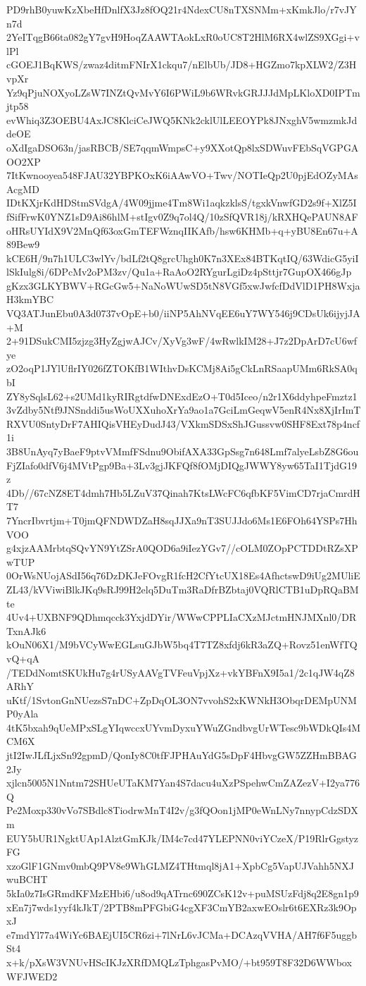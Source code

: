 PD9rhB0yuwKzXbeHfDnlfX3Jz8fOQ21r4NdexCU8nTXSNMm+xKmkJlo/r7vJYn7d
2YeITqgB66ta082gY7gvH9HoqZAAWTAokLxR0oUC8T2HlM6RX4wlZS9XGgi+vlPl
cGOEJ1BqKWS/zwaz4ditmFNIrX1ckqu7/nElbUb/JD8+HGZmo7kpXLW2/Z3HvpXr
Yz9qPjuNOXyoLZsW7INZtQvMvY6I6PWiL9b6WRvkGRJJJdMpLKloXD0IPTmjtp58
evWhiq3Z3OEBU4AxJC8KlciCeJWQ5KNk2cklUlLEEOYPk8JNxghV5wmzmkJddeOE
oXdIgaDSO63n/jasRBCB/SE7qqmWmpsC+y9XXotQp8lxSDWuvFEbSqVGPGAOO2XP
7ItKwnooyea548FJAU32YBPKOxK6iAAwVO+Twv/NOTIeQp2U0pjEdOZyMAsAcgMD
IDtKXjrKdHDStmSVdgA/4W09jjme4Tm8Wi1aqkzklsS/tgxkVnwfGD2s9f+XlZ5I
fSifFrwK0YNZ1sD9Ai86hlM+stIgv0Z9q7ol4Q/10zSfQVR18j/kRXHQePAUN8AF
oHRsUYIdX9V2MnQf63oxGmTEFWznqIIKAfb/hsw6KHMb+q+yBU8En67u+A89Bew9
kCE6H/9n7h1ULC3wlYv/bdLf2tQ8grcUhgh0K7n3XEx84BTKqtIQ/63WdicG5yiI
lSkIulg8i/6DPcMv2oPM3zv/Qu1a+RaAoO2RYgurLgiDz4pSttjr7GupOX466gJp
gKzx3GLKYBWV+RGcGw5+NaNoWUwSD5tN8VGf5xwJwfcfDdVlD1PH8WxjaH3kmYBC
VQ3ATJunEbu0A3d0737vOpE+b0/iiNP5AhNVqEE6uY7WY546j9CDsUk6ijyjJA+M
2+91DSukCMI5zjzg3HyZgjwAJCv/XyVg3wF/4wRwlkIM28+J7z2DpArD7cU6wfye
zO2oqP1JYlUflrIY026fZTOKfB1WIthvDsKCMj8Ai5gCkLnRSaapUMm6RkSA0qbI
ZY8ySqlsL62+s2UMd1kyRIRgtdfwDNExdEzO+T0d5Iceo/n2r1X6ddyhpeFmztz1
3vZdby5Ntf9JNSnddi5usWoUXXuhoXrYa9ao1a7GciLmGeqwV5enR4Nx8XjIrImT
RXVU0SntyDrF7AHIQisVHEyDudJ43/VXkmSDSxShJGussvw0SHF8Ext78p4ncf1i
3B8UnAyq7yBaeF9ptvVMmfFSdnu9ObifAXA33GpSsg7n648Lmf7alyeLsbZ8G6ou
FjZIafo0dfV6j4MVtPgp9Ba+3Lv3gjJKFQf8fOMjDIQgJWWY8yw65TaI1TjdG19z
4Db//67cNZ8ET4dmh7Hb5LZuV37Qinah7KtsLWcFC6qfbKF5VimCD7rjaCmrdHT7
7YncrIbvrtjm+T0jmQFNDWDZaH8sqJJXa9nT3SUJJdo6Ms1E6FOh64YSPs7HhVOO
g4xjzAAMrbtqSQvYN9YtZSrA0QOD6a9iIezYGv7//cOLM0ZOpPCTDDtRZsXPwTUP
0OrWsNUojASdI56q76DzDKJeFOvgR1fcH2CfYtcUX18Es4AfhctswD9iUg2MUliE
ZL43/kVViwiBlkJKq9sRJ99H2elq5DuTm3RaDfrBZbtaj0VQRlCTB1uDpRQaBMte
4Uv4+UXBNF9QDhmqcck3YxjdDYir/WWwCPPLIaCXzMJctmHNJMXnl0/DRTxnAJk6
kOuN06X1/M9bVCyWwEGLsuGJbW5bq4T7TZ8xfdj6kR3aZQ+Rovz51enWfTQvQ+qA
/TEDdNomtSKUkHu7g4rUSyAAVgTVFeuVpjXz+vkYBFnX9I5a1/2c1qJW4qZ8ARhY
uKtf/1SvtonGnNUezsS7nDC+ZpDqOL3ON7vvohS2xKWNkH3ObqrDEMpUNMP0yAla
4tK5bxah9qUeMPxSLgYIqwccxUYvmDyxuYWuZGndbvgUrWTesc9bWDkQIs4MCM6X
jtI2IwJLfLjxSn92gpmD/QonIy8C0tfFJPHAuYdG5sDpF4HbvgGW5ZZHmBBAG2Jy
xjlcn5005N1Nntm72SHUeUTaKM7Yan4S7dacu4uXzPSpehwCmZAZezV+I2ya776Q
Pe2Moxp330vVo7SBdlc8TiodrwMnT4I2v/g3fQOon1jMP0eWnLNy7nnypCdzSDXm
EUY5bUR1NgktUAp1AlztGmKJk/IM4c7cd47YLEPNN0viYCzeX/P19RlrGgstyzFG
xzoGlF1GNmv0mbQ9PV8e9WhGLMZ4THtmql8jA1+XpbCg5VapUJVahh5NXJwuBCHT
5kIa0z7IsGRmdKFMzEHbi6/u8od9qATrnc690ZCsK12v+puMSUzFdj8q2E8gn1p9
xEn7j7wds1yyf4kJkT/2PTB8mPFGbiG4cgXF3CmYB2axwEOslr6t6EXRz3k9OpxJ
e7mdYl77a4WiYc6BAEjUI5CR6zi+7lNrL6vJCMa+DCAzqVVHA/AH7f6F5uggbSt4
x+k/pXsW3VNUvHScIKJzXRfDMQLzTphgasPvMO/+bt959T8F32D6WWboxWFJWED2
